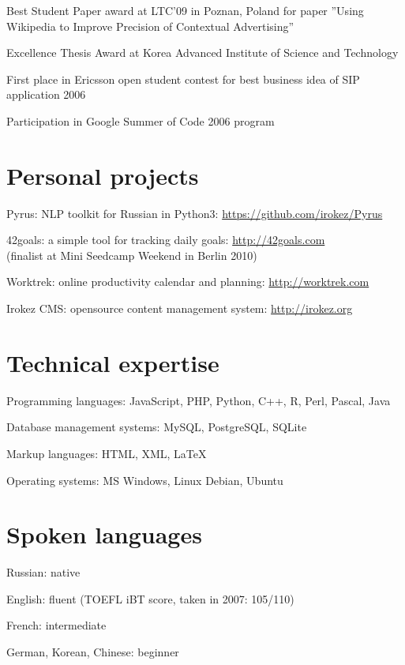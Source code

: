 \documentclass[letterpaper]{article}
\renewenvironment{itemize}{
  \begin{list}{}{
    \setlength{\leftmargin}{0.6em}
  }
}{
  \end{list}
}
\begin{document}
\begin{itemize}

\item Best Student Paper award at LTC'09 in Poznan, Poland for paper ''Using Wikipedia to Improve Precision of Contextual Advertising''

\item Excellence Thesis Award at Korea Advanced Institute of Science and Technology

\item First place in Ericsson open student contest for best business idea of SIP application 2006

\item Participation in Google Summer of Code 2006 program

\end{itemize}


\section*{Personal projects}

\begin{itemize}

\item Pyrus: NLP toolkit for Russian in Python3: \url{https://github.com/irokez/Pyrus}
\item 42goals: a simple tool for tracking daily goals: \url{http://42goals.com} \\
(finalist at Mini Seedcamp Weekend in Berlin 2010)
\item Worktrek: online productivity calendar and planning: \url{http://worktrek.com}
\item Irokez CMS: opensource content management system: \url{http://irokez.org}

\end{itemize}

\section*{Technical expertise}
\begin{itemize}
\item Programming languages: JavaScript, PHP, Python, C++, R, Perl, Pascal, Java
\item Database management systems: MySQL, PostgreSQL, SQLite
\item Markup languages: HTML, XML, LaTeX
\item Operating systems: MS Windows, Linux Debian, Ubuntu
\end{itemize}

\section*{Spoken languages}
\begin{itemize}
\item Russian: native
\item English: fluent (TOEFL iBT score, taken in 2007: 105/110)
\item French: intermediate
\item German, Korean, Chinese: beginner
\end{itemize}
\end{document}
